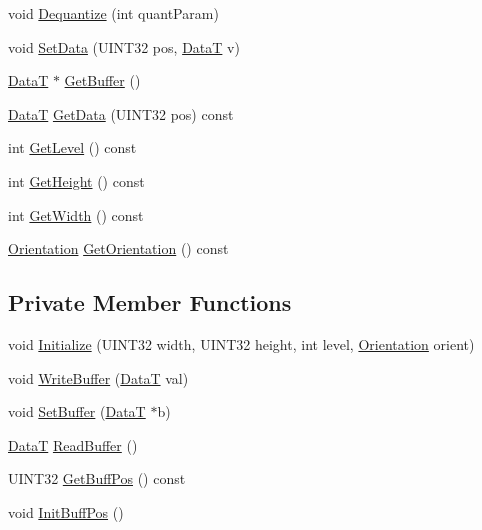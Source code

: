 \begin{DoxyCompactItemize}
void \mbox{\hyperlink{classCSubband_a45102bab9eee9b4e2beeea105712f292}{Dequantize}} (int quant\+Param)
\item 
void \mbox{\hyperlink{classCSubband_a1f128e212fb98c19f2d1dcd7ac6ccc0b}{Set\+Data}} (U\+I\+N\+T32 pos, \mbox{\hyperlink{PGFtypes_8h_acb1ee3f52ccfad782dcaa0abd79e5d05}{DataT}} v)
\item 
\mbox{\hyperlink{PGFtypes_8h_acb1ee3f52ccfad782dcaa0abd79e5d05}{DataT}} $\ast$ \mbox{\hyperlink{classCSubband_aa4a60fd0c2e3ad2742bca6b8e819d5c5}{Get\+Buffer}} ()
\item 
\mbox{\hyperlink{PGFtypes_8h_acb1ee3f52ccfad782dcaa0abd79e5d05}{DataT}} \mbox{\hyperlink{classCSubband_af3b0eb40a0887219e6caaeb5cb394f63}{Get\+Data}} (U\+I\+N\+T32 pos) const
\item 
int \mbox{\hyperlink{classCSubband_a4099f78d8e5541cb8b4d27fea63c8f1b}{Get\+Level}} () const
\item 
int \mbox{\hyperlink{classCSubband_ab318beb155b4526adf67f91ea1c4b930}{Get\+Height}} () const
\item 
int \mbox{\hyperlink{classCSubband_a3f53e4fc362e02aa0ff3121485a6c760}{Get\+Width}} () const
\item 
\mbox{\hyperlink{PGFtypes_8h_a871118a09520247c78a71ecd7b0abd58}{Orientation}} \mbox{\hyperlink{classCSubband_a5564725a3c96d5359a875a25d9f938b3}{Get\+Orientation}} () const
\end{DoxyCompactItemize}
\subsection*{Private Member Functions}
\begin{DoxyCompactItemize}
\item 
void \mbox{\hyperlink{classCSubband_a5bdfe417903304a7b7348feb65904839}{Initialize}} (U\+I\+N\+T32 width, U\+I\+N\+T32 height, int level, \mbox{\hyperlink{PGFtypes_8h_a871118a09520247c78a71ecd7b0abd58}{Orientation}} orient)
\item 
void \mbox{\hyperlink{classCSubband_a3bebc017649e7dbef182efe3cbe17965}{Write\+Buffer}} (\mbox{\hyperlink{PGFtypes_8h_acb1ee3f52ccfad782dcaa0abd79e5d05}{DataT}} val)
\item 
void \mbox{\hyperlink{classCSubband_a2da2078e1050116b47760ede30e4e503}{Set\+Buffer}} (\mbox{\hyperlink{PGFtypes_8h_acb1ee3f52ccfad782dcaa0abd79e5d05}{DataT}} $\ast$b)
\item 
\mbox{\hyperlink{PGFtypes_8h_acb1ee3f52ccfad782dcaa0abd79e5d05}{DataT}} \mbox{\hyperlink{classCSubband_ad32cf00a5ee6a65573bcacd440308673}{Read\+Buffer}} ()
\item 
U\+I\+N\+T32 \mbox{\hyperlink{classCSubband_a682074175296debbf4ca81a24cba0268}{Get\+Buff\+Pos}} () const
\item 
void \mbox{\hyperlink{classCSubband_a1a5bca84a7ceb1ed6dbe417f8d6836ba}{Init\+Buff\+Pos}} ()
\end{DoxyCompactItemize}
